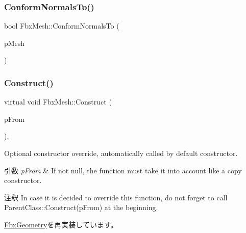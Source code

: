 \mbox{\label{class_fbx_mesh_ac6499edbc0a86efac04bf2591756ed1e}} 
\subsubsection{\texorpdfstring{Conform\+Normals\+To()}{ConformNormalsTo()}}
{\footnotesize\ttfamily bool Fbx\+Mesh\+::\+Conform\+Normals\+To (\begin{DoxyParamCaption}\item[{const \hyperlink{class_fbx_mesh}{Fbx\+Mesh} $\ast$}]{p\+Mesh }\end{DoxyParamCaption})}

\mbox{\label{class_fbx_mesh_a230787ca87312437d427d9ec7c150565}} 
\subsubsection{\texorpdfstring{Construct()}{Construct()}}
{\footnotesize\ttfamily virtual void Fbx\+Mesh\+::\+Construct (\begin{DoxyParamCaption}\item[{const \hyperlink{class_fbx_object}{Fbx\+Object} $\ast$}]{p\+From }\end{DoxyParamCaption})\hspace{0.3cm}{\ttfamily [protected]}, {\ttfamily [virtual]}}

Optional constructor override, automatically called by default constructor. 
\begin{DoxyParams}{引数}
{\em p\+From} & If not null, the function must take it into account like a copy constructor. \\
\hline
\end{DoxyParams}
\begin{DoxyRemark}{注釈}
In case it is decided to override this function, do not forget to call Parent\+Class\+::\+Construct(p\+From) at the beginning. 
\end{DoxyRemark}


\hyperlink{class_fbx_geometry_a26ca96a86f17783c45ff83b33d2b5324}{Fbx\+Geometry}を再実装しています。

\mbox{\label{class_fbx_mesh_aacd77ff7908d897c73983919c4aade72}} 
